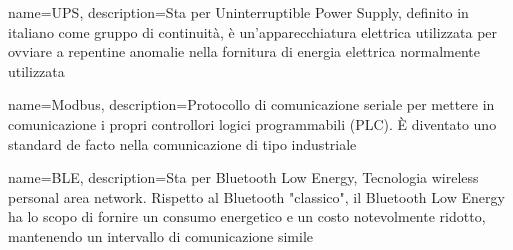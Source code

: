 {
	name={UPS},
	description={Sta per Uninterruptible Power Supply, definito in italiano come gruppo di continuità, è un'apparecchiatura elettrica utilizzata per ovviare a repentine anomalie nella fornitura di energia elettrica normalmente utilizzata}
}

{
	name={Modbus},
	description={Protocollo di comunicazione seriale per mettere in comunicazione i propri controllori logici programmabili (PLC). È diventato uno standard de facto nella comunicazione di tipo industriale}
}

{
	name={BLE},
	description={Sta per Bluetooth Low Energy, Tecnologia wireless personal area network. Rispetto al Bluetooth "classico", il Bluetooth Low Energy ha lo scopo di fornire un consumo energetico e un costo notevolmente ridotto, mantenendo un intervallo di comunicazione simile}
}

